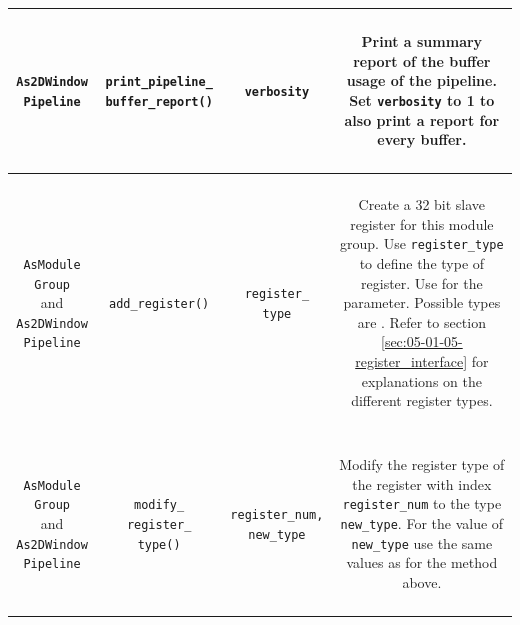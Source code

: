 \begin{longtable}[htbp]{|c|c|c|c|}
\hline
\parbox{2.5cm}{~\\ \texttt{As2DWindow Pipeline}\\~} & \parbox{3cm}{~\\ \texttt{print\_pipeline\_ buffer\_report()}\\~} & \parbox{3cm}{~ \\ \texttt{verbosity} \\ ~} & \parbox{6cm}{~\\ Print a summary report of the buffer usage of the pipeline. Set \texttt{verbosity} to 1 to also print a report for every buffer. \\~}\\
\hline

\parbox{2.5cm}{~\\ \texttt{AsModule Group} \\ and\\ \texttt{As2DWindow Pipeline}\\~} & \parbox{3cm}{~\\ \texttt{add\_register()}\\~} & \parbox{3cm}{~ \\ \texttt{register\_ type} \\ ~} & \parbox{6cm}{~\\ Create a 32 bit slave register for this module group. Use \texttt{register\_type} to define the type of register. Use  for the parameter. Possible types are . Refer to section \ref{sec:05-01-05-register_interface} for explanations on the different register types. \\~}\\
\hline
\parbox{2.5cm}{~\\ \texttt{AsModule Group} \\ and\\ \texttt{As2DWindow Pipeline}\\~} & \parbox{3cm}{~\\ \texttt{modify\_ register\_ type()}\\~} & \parbox{3cm}{~ \\ \texttt{register\_num, new\_type} \\ ~} & \parbox{6cm}{~\\ Modify the register type of the register with index \texttt{register\_num} to the type \texttt{new\_type}. For the value of \texttt{new\_type} use the same values as for the method  above. \\~}\\

\end{longtable}
